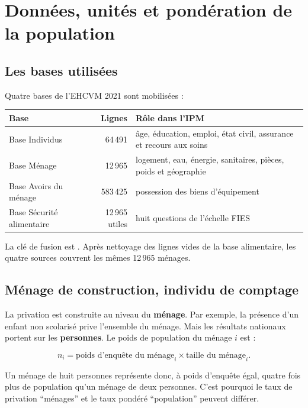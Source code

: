 \documentclass[11pt,a4paper]{article}
\begin{document}
\section{Données, unités et pondération de la population}

\subsection{Les bases utilisées}

Quatre bases de l'EHCVM 2021 sont mobilisées :

\begin{center}
\small
\begin{tabular}{@{}p{4.2cm}rp{6.4cm}@{}}
\toprule
\textbf{Base} & \textbf{Lignes} & \textbf{Rôle dans l'IPM} \\
\midrule
Base Individus & 64\,491 & âge, éducation, emploi, état civil, assurance et recours aux soins \\
Base Ménage & 12\,965 & logement, eau, énergie, sanitaires, pièces, poids et géographie \\
Base Avoirs du ménage & 583\,425 & possession des biens d'équipement \\
Base Sécurité alimentaire & 12\,965 utiles & huit questions de l'échelle FIES \\
\bottomrule
\end{tabular}
\end{center}

La clé de fusion est . Après nettoyage des lignes vides de la base
alimentaire, les quatre sources couvrent les mêmes 12\,965 ménages.

\subsection{Ménage de construction, individu de comptage}

La privation est construite au niveau du \textbf{ménage}. Par exemple, la présence d'un enfant non
scolarisé prive l'ensemble du ménage. Mais les résultats nationaux portent sur les
\textbf{personnes}. Le poids de population du ménage $i$ est :

\[
  n_i = \text{poids d'enquête du ménage}_i \times \text{taille du ménage}_i.
\]

Un ménage de huit personnes représente donc, à poids d'enquête égal, quatre fois plus de
population qu'un ménage de deux personnes. C'est pourquoi le taux de privation ``ménages'' et le
taux pondéré ``population'' peuvent différer.
\end{document}
